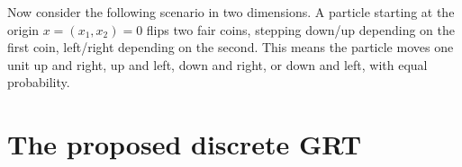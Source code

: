 Now consider the following scenario in two dimensions. A particle starting at the origin $x = (x_1, x_2) = 0$ flips two fair coins, stepping down/up depending on the first coin, left/right depending on the second. This means the particle moves one unit up and right, up and left, down and right, or down and left, with equal probability. 

\section{The proposed discrete GRT}


  
